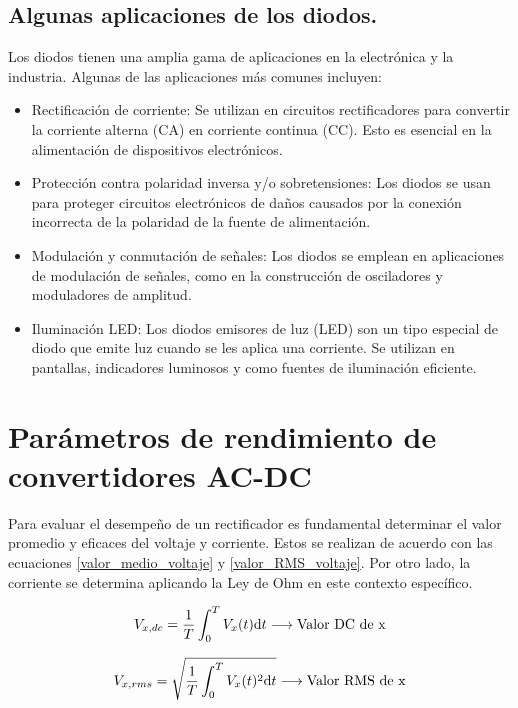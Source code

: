 \documentclass[isoft]{ssltexposter}
\begin{document}
\begin{poster}
\subsection{Algunas aplicaciones de los diodos.}

Los diodos tienen una amplia gama de aplicaciones en la electrónica y la industria. Algunas de las aplicaciones más comunes incluyen:

\begin{itemize}
    \item Rectificación de corriente: Se utilizan en circuitos rectificadores para convertir la corriente alterna (CA) en corriente continua (CC). Esto es esencial en la alimentación de dispositivos electrónicos.
    \item Protección contra polaridad inversa y/o sobretensiones: Los diodos se usan para proteger circuitos electrónicos de daños causados por la conexión incorrecta de la polaridad de la fuente de alimentación.
    \item  Modulación y conmutación de señales: Los diodos se emplean en aplicaciones de modulación de señales, como en la construcción de osciladores y moduladores de amplitud.
    \item Iluminación LED: Los diodos emisores de luz (LED) son un tipo especial de diodo que emite luz cuando se les aplica una corriente. Se utilizan en pantallas, indicadores luminosos y como fuentes de iluminación eficiente.
\end{itemize}
    


\newpage
\BgThispage
\section{Parámetros de rendimiento de convertidores AC-DC}

Para evaluar el desempeño de un rectificador es fundamental determinar el valor promedio y eficaces del voltaje y corriente. Estos se realizan de acuerdo con las ecuaciones \ref{valor_medio_voltaje} y \ref{valor_RMS_voltaje}. Por otro lado, la corriente se determina aplicando la Ley de Ohm en este contexto específico.

\begin{equation}
\label{valor_medio_voltaje}
    V_{x,dc}= \frac{1}{T}\int_0^T V_x(t) \mathrm{d}t \longrightarrow \textup{Valor DC de x}
\end{equation}

\begin{equation}
    \label{valor_RMS_voltaje}
    V_{x,rms}= \sqrt{\frac{1}{T} \int_0^T V_x(t)^2 \mathrm{d}t} \longrightarrow \textup{Valor RMS de x}
\end{equation}


\end{poster}
\end{document}
